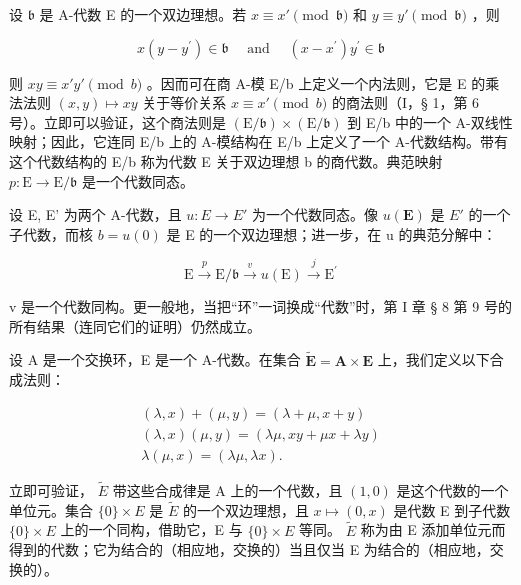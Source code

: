 设 \(\mathfrak{b}\) 是 A-代数 E 的一个双边理想。若 \(x \equiv x'\pmod{\mathfrak{b}}\) 和 \(y \equiv y'\pmod{\mathfrak{b}}\) ，则

\[
x (y - y ^ {\prime}) \in \mathfrak {b} \quad \text { and } \quad (x - x ^ {\prime}) y ^ {\prime} \in \mathfrak {b}
\]

则 \(xy \equiv x'y' \pmod{b}\) 。因而可在商 A-模 E/b 上定义一个内法则，它是 E 的乘法法则 \((x,y) \mapsto xy\) 关于等价关系 \(x \equiv x' \pmod{b}\) 的商法则（I，§ 1，第 6 号）。立即可以验证，这个商法则是 \((\mathrm{E} / \mathfrak{b}) \times (\mathrm{E} / \mathfrak{b})\) 到 E/b 中的一个 A-双线性映射；因此，它连同 E/b 上的 A-模结构在 E/b 上定义了一个 A-代数结构。带有这个代数结构的 E/b 称为代数 E 关于双边理想 b 的商代数。典范映射 \(p: \mathrm{E} \to \mathrm{E} / \mathfrak{b}\) 是一个代数同态。

设 E, E' 为两个 A-代数，且 \(u:E \rightarrow E'\) 为一个代数同态。像 \(u(\mathbf{E})\) 是 \(E'\) 的一个子代数，而核 \(b = u(0)\) 是 E 的一个双边理想；进一步，在 u 的典范分解中：

\[
\mathrm{E} \xrightarrow {p} \mathrm{E} / \mathfrak {b} \xrightarrow {v} u (\mathrm{E}) \xrightarrow {j} \mathrm{E} ^ {\prime}
\]

v 是一个代数同构。更一般地，当把“环”一词换成“代数”时，第 I 章 § 8 第 9 号的所有结果（连同它们的证明）仍然成立。

设 A 是一个交换环，E 是一个 A-代数。在集合 \(\tilde{\mathbf{E}} = \mathbf{A} \times \mathbf{E}\) 上，我们定义以下合成法则：

\[
\begin{array}{r} (\lambda , x) + (\mu , y) = (\lambda + \mu , x + y) \\ (\lambda , x) (\mu , y) = (\lambda \mu , x y + \mu x + \lambda y) \\ \lambda (\mu , x) = (\lambda \mu , \lambda x). \end{array}
\]

立即可验证， \(\tilde{E}\) 带这些合成律是 A 上的一个代数，且 \((1,0)\) 是这个代数的一个单位元。集合 \(\{0\}\times E\) 是 \(\tilde{E}\) 的一个双边理想，且 \(x\mapsto(0,x)\) 是代数 E 到子代数 \(\{0\}\times E\) 上的一个同构，借助它，E 与 \(\{0\}\times E\) 等同。 \(\tilde{E}\) 称为由 E 添加单位元而得到的代数；它为结合的（相应地，交换的）当且仅当 E 为结合的（相应地，交换的）。

